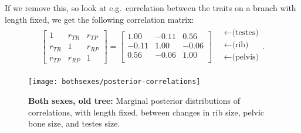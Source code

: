 \documentclass{article}
\begin{document}
If we remove this, so look at e.g.\ correlation between the traits on a branch with length fixed,
we get the following correlation matrix:
\begin{align}
\begin{bmatrix}
  1 & r_{TR} & r_{TP} \\ 
  r_{TR} & 1 & r_{RP} \\ 
  r_{TP} & r_{RP} & 1 
 \end{bmatrix}
 =
\begin{bmatrix}
  1.00 & -0.11 & 0.56 \\ 
  -0.11 & 1.00 & -0.06 \\ 
  0.56 & -0.06 & 1.00 \\ 
 \end{bmatrix}
\quad \begin{matrix}
  \leftarrow \text{(testes)} \\
  \leftarrow \text{(rib)} \\
  \leftarrow \text{(pelvis)} \\
\end{matrix}  .
\end{align}

\begin{figure}[ht]
  \begin{center}
    \texttt{[image: bothsexes/posterior-correlations]}
  \end{center}
  \caption{\textbf{Both sexes, old tree:} Marginal posterior distributions of correlations, with length fixed,
  between changes in rib size, pelvic bone size, and testes size.
  \label{fig:posterior_cors}
  }
\end{figure}
\end{document}

